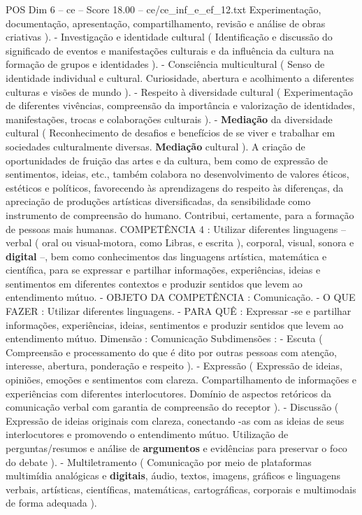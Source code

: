 \begin{textsample}{POS Dim 6 – ce – Score 18.00 – ce/ce\_inf\_e\_ef\_12.txt}
Experimentação, documentação, apresentação, compartilhamento, revisão e análise de obras criativas ). - Investigação e identidade cultural ( Identificação e discussão do significado de eventos e manifestações culturais e da influência da cultura na formação de grupos e identidades ). - Consciência multicultural ( Senso de identidade individual e cultural.
Curiosidade, abertura e acolhimento a diferentes culturas e visões de mundo ). - Respeito à diversidade cultural ( Experimentação de diferentes vivências, compreensão da importância e valorização de identidades, manifestações, trocas e colaborações culturais ). - \textbf{Mediação} da diversidade cultural ( Reconhecimento de desafios e benefícios de se viver e trabalhar em sociedades culturalmente diversas. \textbf{Mediação} cultural ).
A criação de oportunidades de fruição das artes e da cultura, bem como de expressão de sentimentos, ideias, etc., também colabora no desenvolvimento de valores éticos, estéticos e políticos, favorecendo às aprendizagens do respeito às diferenças, da apreciação de produções artísticas diversificadas, da sensibilidade como instrumento de compreensão do humano.
Contribui, certamente, para a formação de pessoas mais humanas.
COMPETÊNCIA 4 : Utilizar diferentes linguagens – verbal ( oral ou visual-motora, como Libras, e escrita ), corporal, visual, sonora e \textbf{digital} –, bem como conhecimentos das linguagens artística, matemática e científica, para se expressar e partilhar informações, experiências, ideias e sentimentos em diferentes contextos e produzir sentidos que levem ao entendimento mútuo. - OBJETO DA COMPETÊNCIA : Comunicação. - O QUE FAZER : Utilizar diferentes linguagens. - PARA QUÊ : Expressar -se e partilhar informações, experiências, ideias, sentimentos e produzir sentidos que levem ao entendimento mútuo.
Dimensão : Comunicação Subdimensões : - Escuta ( Compreensão e processamento do que é dito por outras pessoas com atenção, interesse, abertura, ponderação e respeito ). - Expressão ( Expressão de ideias, opiniões, emoções e sentimentos com clareza.
Compartilhamento de informações e experiências com diferentes interlocutores.
Domínio de aspectos retóricos da comunicação verbal com garantia de compreensão do receptor ). - Discussão ( Expressão de ideias originais com clareza, conectando -as com as ideias de seus interlocutores e promovendo o entendimento mútuo.
Utilização de perguntas/resumos e análise de \textbf{argumentos} e evidências para preservar o foco do debate ). - Multiletramento ( Comunicação por meio de plataformas multimídia analógicas e \textbf{digitais}, áudio, textos, imagens, gráficos e linguagens verbais, artísticas, científicas, matemáticas, cartográficas, corporais e multimodais de forma adequada ).

\end{textsample}

